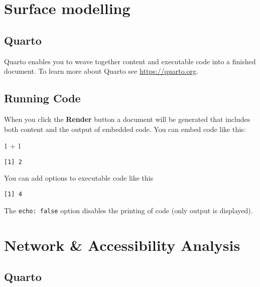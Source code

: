 \documentclass[
  letterpaper,
  DIV=11,
  numbers=noendperiod]{scrreprt}
\newenvironment{Shaded}{\begin{snugshade}}{\end{snugshade}}
\newcommand{\DecValTok}[1]{\textcolor[rgb]{0.68,0.00,0.00}{#1}}
\newcommand{\SpecialCharTok}[1]{\textcolor[rgb]{0.37,0.37,0.37}{#1}}
\begin{document}
\hypertarget{surface-modelling}{%
\chapter{Surface modelling}\label{surface-modelling}}

\hypertarget{quarto-7}{%
\section{Quarto}\label{quarto-7}}

Quarto enables you to weave together content and executable code into a
finished document. To learn more about Quarto see
\url{https://quarto.org}.

\hypertarget{running-code-7}{%
\section{Running Code}\label{running-code-7}}

When you click the \textbf{Render} button a document will be generated
that includes both content and the output of embedded code. You can
embed code like this:

\begin{Shaded}
\begin{Highlighting}[]
\DecValTok{1} \SpecialCharTok{+} \DecValTok{1}
\end{Highlighting}
\end{Shaded}

\begin{verbatim}
[1] 2
\end{verbatim}

You can add options to executable code like this

\begin{verbatim}
[1] 4
\end{verbatim}

The \texttt{echo:\ false} option disables the printing of code (only
output is displayed).

\hypertarget{network-accessibility-analysis}{%
\chapter{Network \& Accessibility
Analysis}\label{network-accessibility-analysis}}

\hypertarget{quarto-8}{%
\section{Quarto}\label{quarto-8}}
\end{document}
